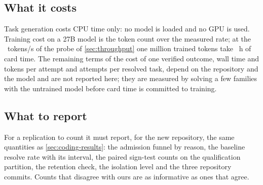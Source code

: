 \begin{table}[tbp]
\centering\small

\caption{The eight authored repository families: language, tests, and tasks admitted by the
fault-seeding funnel (values read from the family catalogue at the pinned revision and
checked by the ledger).}\label{tab:families}
\end{table}

\subsection{What it costs}

Task generation costs CPU time only: no model is loaded and no GPU is used. Training
cost on a 27B model is the token count over the measured rate; at the \mThrNfFourEightOneNineTwoTokensPerS{}~tokens/s of the
probe of \cref{sec:throughput} one million trained tokens take \mThrHoursPerMillionTokens{}~h
of card time. The remaining terms of the cost of one verified outcome, wall time and
tokens per attempt and attempts per resolved task, depend on the repository and the model and are
not reported here; they are measured by solving a few families with the untrained model before
card time is committed to training.

\subsection{What to report}

For a replication to count it must report, for the new repository, the same quantities as
\cref{sec:coding-results}: the admission funnel by reason, the baseline resolve rate with its
interval, the paired sign-test counts on the qualification partition, the retention check,
the isolation level and the three repository commits. Counts that disagree with ours are as
informative as ones that agree.

